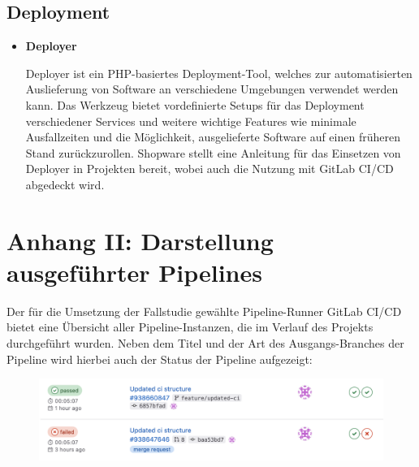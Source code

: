 \clearpage

\subsection*{Deployment}

\begin{itemize}
    \item {
        \textbf{Deployer}\par
        Deployer ist ein PHP-basiertes Deployment-Tool, welches zur automatisierten Auslieferung von Software an
        verschiedene Umgebungen verwendet werden kann.
        Das Werkzeug bietet vordefinierte Setups für das Deployment verschiedener Services und weitere wichtige
        Features wie minimale Ausfallzeiten und die Möglichkeit, ausgelieferte Software auf einen früheren Stand
        zurückzurollen.
        Shopware stellt eine Anleitung für das Einsetzen von Deployer in Projekten bereit, wobei auch die Nutzung mit
        GitLab CI/CD abgedeckt wird.
    }
\end{itemize}

\clearpage

\section{Anhang II: Darstellung ausgeführter Pipelines} \label{sec:appendix-2}

Der für die Umsetzung der Fallstudie gewählte Pipeline-Runner GitLab CI/CD bietet eine Übersicht aller
Pipeline-Instanzen, die im Verlauf des Projekts durchgeführt wurden.
Neben dem Titel und der Art des Ausgangs-Branches der Pipeline wird hierbei auch der Status der Pipeline aufgezeigt:

\begin{figure}[H]
    \centering
    \includegraphics[width=\textwidth]{images/content/pipeline-overview}
    \label{fig:pipeline-overview}
\end{figure}


